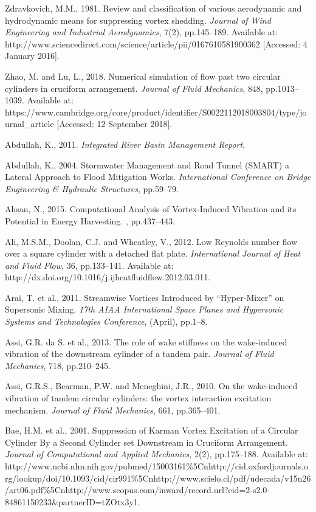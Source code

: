 \documentclass[]{article}
\begin{document}
Zdravkovich, M.M., 1981. Review and classification of various
aerodynamic and hydrodynamic means for suppressing vortex shedding.
\emph{Journal of Wind Engineering and Industrial Aerodynamics}, 7(2),
pp.145--189. Available at:
http://www.sciencedirect.com/science/article/pii/0167610581900362
{[}Accessed: 4 January 2016{]}.

Zhao, M. and Lu, L., 2018. Numerical simulation of flow past two
circular cylinders in cruciform arrangement. \emph{Journal of Fluid
Mechanics}, 848, pp.1013--1039. Available at:
https://www.cambridge.org/core/product/identifier/S0022112018003804/type/journal\_article
{[}Accessed: 12 September 2018{]}.

Abdullah, K., 2011. \emph{Integrated River Basin Management Report},

Abdullah, K., 2004. Stormwater Management and Road Tunnel (SMART) a
Lateral Approach to Flood Mitigation Works. \emph{International
Conference on Bridge Engineering \& Hydraulic Structures}, pp.59--79.

Ahsan, N., 2015. Computational Analysis of Vortex-Induced Vibration and
its Potential in Energy Harvesting. , pp.437--443.

Ali, M.S.M., Doolan, C.J. and Wheatley, V., 2012. Low Reynolds number
flow over a square cylinder with a detached flat plate.
\emph{International Journal of Heat and Fluid Flow}, 36, pp.133--141.
Available at: http://dx.doi.org/10.1016/j.ijheatfluidflow.2012.03.011.

Arai, T. et al., 2011. Streamwise Vortices Introduced by ``Hyper-Mixer''
on Supersonic Mixing. \emph{17th AIAA International Space Planes and
Hypersonic Systems and Technologies Conference}, (April), pp.1--8.

Assi, G.R. da S. et al., 2013. The role of wake stiffness on the
wake-induced vibration of the downstream cylinder of a tandem pair.
\emph{Journal of Fluid Mechanics}, 718, pp.210--245.

Assi, G.R.S., Bearman, P.W. and Meneghini, J.R., 2010. On the
wake-induced vibration of tandem circular cylinders: the vortex
interaction excitation mechanism. \emph{Journal of Fluid Mechanics},
661, pp.365--401.

Bae, H.M. et al., 2001. Suppression of Karman Vortex Excitation of a
Circular Cylinder By a Second Cylinder set Downstream in Cruciform
Arrangement. \emph{Journal of Computational and Applied Mechanics},
2(2), pp.175--188. Available at:
http://www.ncbi.nlm.nih.gov/pubmed/15003161\%5Cnhttp://cid.oxfordjournals.org/lookup/doi/10.1093/cid/cir991\%5Cnhttp://www.scielo.cl/pdf/udecada/v15n26/art06.pdf\%5Cnhttp://www.scopus.com/inward/record.url?eid=2-s2.0-84861150233\&partnerID=tZOtx3y1.
\end{document}
